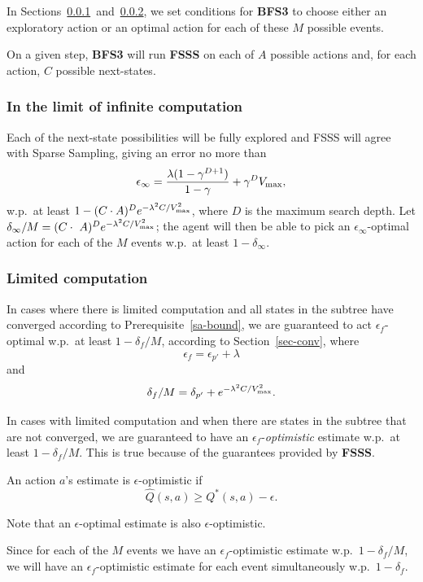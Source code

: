 In Sections~\ref{sec:inf}~and~\ref{sec:fin}, we set conditions for {\bf BFS3} to choose either an exploratory action or an optimal action for each of these $M$ possible events.

On a given step, {\bf BFS3} will run {\bf FSSS} on each of $A$ possible actions and, for each action, $C$ possible next-states.


\subsubsection{In the limit of infinite computation}
\label{sec:inf}

Each of the next-state possibilities will be fully explored and FSSS will agree with Sparse Sampling, giving an error no more than 
$$\epsilon_\infty = \frac {\lambda(1-\gamma^{D+1})} {1-\gamma}+\gamma^DV_{\rm max},$$
w.p.\ at least $1-(C\cdot A)^D e^{-\lambda^2C/V_{\rm max}^2}$, where $D$ is the maximum search depth. Let $\delta_\infty/M=(C\cdot~A)^De^{-\lambda^2C/V_{\rm max}^2}$; the agent will then be able to pick an $\epsilon_\infty$-optimal action for each of the $M$ events w.p.\ at least $1-\delta_\infty$.

\subsubsection{Limited computation}
\label{sec:fin}

In cases where there is limited computation and all states in the subtree have converged according to Prerequisite~\ref{sa-bound}, we are guaranteed to act $\epsilon_f$-optimal w.p.\ at least $1 - \delta_f/M$, according to Section~\ref{sec-conv}, where
$$\epsilon_f = \epsilon_{p'}+\lambda$$
and
$$\delta_f/M = \delta_{p'} + e^{-\lambda^2 C / {V_{\rm max}^2}}.$$

In cases with limited computation and when there are states in the subtree that are not converged, we are guaranteed to have an $\epsilon_f$-\emph{optimistic} estimate w.p.\ at least $1-\delta_f/M$. This is true because of the guarantees provided by {\bf FSSS}.

An action $a$'s estimate is $\epsilon$-optimistic if
$$\hat Q(s, a) \geq Q^*(s, a) - \epsilon.$$

Note that an $\epsilon$-optimal estimate is also $\epsilon$-optimistic.

Since for each of the $M$ events we have an $\epsilon_f$-optimistic estimate w.p.\ $1-\delta_f/M$, we will have an $\epsilon_f$-optimistic estimate for each event simultaneously w.p.\ $1-\delta_f$.

